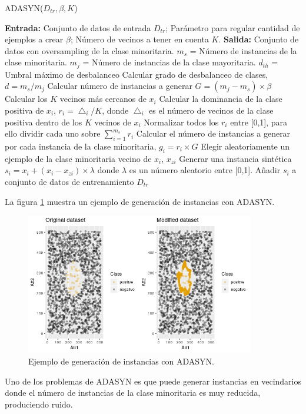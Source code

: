 \begin{algorithm}
	\caption{ADASYN($D_{tr}, \beta, K$)}
	\label{algo:adasyn}
	\begin{algorithmic}[0]
		\State \textbf{Entrada:} Conjunto de datos de entrada $D_{tr}$; Parámetro para regular cantidad de ejemplos a crear $\beta$; Número de vecinos a tener en cuenta $K$.
		\State \textbf{Salida:} Conjunto de datos con oversampling de la clase minoritaria.
		\State $m_s$ = Número de instancias de la clase minoritaria.
		\State $m_j$ = Número de instancias de la clase mayoritaria.
		\State $d_{th}$ = Umbral máximo de desbalanceo
		\State Calcular grado de desbalanceo de clases, $d = m_s/m_j$
			\State Calcular número de instancias a generar $G = (m_j - m_s) \times \beta$
				\State Calcular los $K$ vecinos más cercanos de $x_i$
				\State Calcular la dominancia de la clase positiva de $x_i$, $r_i = \bigtriangleup_i / K$, donde $\bigtriangleup_i$ es el número de vecinos de la clase positiva dentro de los $K$ vecinos de $x_i$
			\EndFor
			\State Normalizar todos los $r_i$ entre [0,1], para ello dividir cada uno sobre $\sum_{i=1}^{m_s} r_i$
			\State Calcular el número de instancias a generar por cada instancia de la clase minoritaria, $g_i = r_i \times G$
					\State Elegir aleatoriamente un ejemplo de la clase minoritaria vecino de $x_i$, $x_{zi}$
					\State Generar una instancia sintética $s_i = x_i + (x_i - x_{zi}) \times \lambda$ donde $\lambda$ es un número aleatorio entre [0,1].
					\State Añadir $s_i$ a conjunto de datos de entrenamiento $D_{tr}$
				\EndFor
			\EndFor
		\EndIf
	\end{algorithmic}
\end{algorithm}



La figura \ref{fig:43} muestra un ejemplo de generación de instancias con ADASYN.\newline

\begin{figure}[H]
	\centering
	\includegraphics[width=100mm]{imagenes/ADASYN_comparison.png}
	\caption{Ejemplo de generación de instancias con ADASYN.}
	\label{fig:43}
\end{figure}
\verticalspace

Uno de los problemas de ADASYN es que puede generar instancias en vecindarios donde el número de instancias de la clase minoritaria es muy reducida, produciendo ruido.

